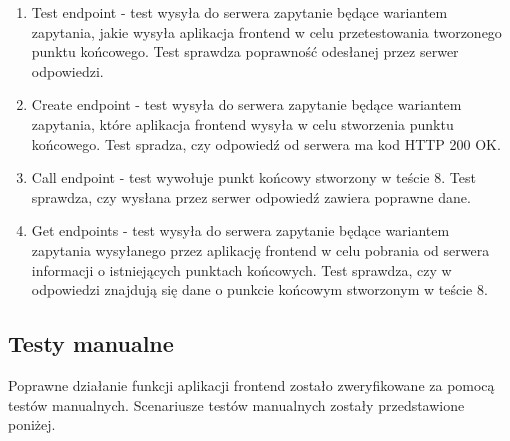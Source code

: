 \begin{enumerate}
    \item Test endpoint - test wysyła do serwera zapytanie będące wariantem
        zapytania, jakie wysyła aplikacja frontend w celu przetestowania
        tworzonego punktu końcowego. Test sprawdza poprawność odesłanej przez
        serwer odpowiedzi.

    \item Create endpoint - test wysyła do serwera zapytanie będące wariantem
        zapytania, które aplikacja frontend wysyła w celu stworzenia punktu
        końcowego. Test spradza, czy odpowiedź od serwera ma kod HTTP 200 OK.

    \item Call endpoint - test wywołuje punkt końcowy stworzony w teście 8. Test
        sprawdza, czy wysłana przez serwer odpowiedź zawiera poprawne dane.

    \item Get endpoints - test wysyła do serwera zapytanie będące wariantem
        zapytania wysyłanego przez aplikację frontend w celu pobrania od serwera
        informacji o istniejących punktach końcowych. Test sprawdza, czy w
        odpowiedzi znajdują się dane o punkcie końcowym stworzonym w teście 8.

\end{enumerate}

\subsection{Testy manualne}

Poprawne działanie funkcji aplikacji frontend zostało zweryfikowane za pomocą
testów manualnych. Scenariusze testów manualnych zostały przedstawione
poniżej.

